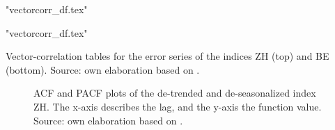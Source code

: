 \documentclass[11pt]{article}
\begin{document}
\begin{table}[p]
	\centering
	\begin{minipage}{1\linewidth}
		\centering
		{"vectorcorr_df.tex"}
		\vspace*{0.7 cm}
	\end{minipage}
	\begin{minipage}{1\linewidth}
		\centering
		{"vectorcorr_df.tex"}
		\vspace*{0.7 cm}
	\end{minipage}
	\caption{Vector-correlation tables for the error series of the indices ZH (top) and BE (bottom). Source: own elaboration based on \cite{googleT}.}
	\label{tab:vectorcorr}
\end{table}
\begin{figure}[p!]
	\begin{minipage}{.5\linewidth}
		\centering
	\end{minipage}	\begin{minipage}{.5\linewidth}
		\centering
	\end{minipage}
	\caption{ACF and PACF plots of the de-trended and de-seasonalized index ZH. The x-axis describes the lag, and the y-axis the function value. Source: own elaboration based on \cite{googleT}.}
	\label{fig:ACFPACF_ZH}
\end{figure}
\end{document}
